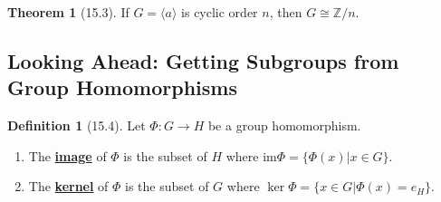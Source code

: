 \documentclass{article}
\newcommand{\Z}{\mathbb{Z}}
\newcommand{\define}[1]{\textbf{\underline{#1}}}
\newcommand{\func}[3]{#1: #2 \to #3}
\newcommand{\gen}[1]{\langle#1\rangle}
\newcommand{\im}[1]{\mathrm{im}#1}
\theoremstyle{definition}
\newtheorem*{defn}{Definition}
\newtheorem*{thm}{Theorem}
\theoremstyle{remark}
\begin{document}
{{            \begin{thm}[15.3]
                If $G=\gen{a}$ is cyclic order $n$, then $G\cong \Z/n$.
            \end{thm}
        }
        \subsection*{Looking Ahead: Getting Subgroups from Group Homomorphisms}{
            \begin{defn}[15.4]
                Let $\func{\Phi}{G}{H}$ be a group homomorphism.
     \begin{enumerate}
         \item The \define{image} of $\Phi$ is the subset of $H$ where $\im{\Phi}=\{\Phi(x)|x\in G\}$.
         \item The \define{kernel} of $\Phi$ is the subset of $G$ where $\ker{\Phi}=\{x\in G|\Phi(x)=e_H\}$.
     \end{enumerate}
            \end{defn}
        }
    }
\end{document}
